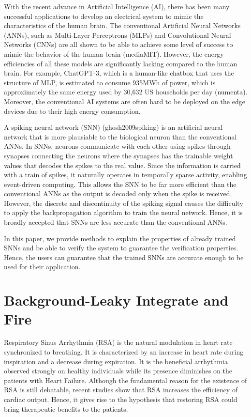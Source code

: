 \documentclass[conference]{IEEEtran}
\begin{document}
With the recent advance in Artificial Intelligence (AI), there has been many successful applications to develop an electrical system to mimic the 
characteristics of the human brain. The conventional Artificial Neural Networks (ANNs), such as Multi-Layer Perceptrons (MLPs) and Convolutional Neural Networks (CNNs) are all shown to be able to achieve
some level of success to mimic the behavior of the human brain (mediaMIT). However, the energy efficiencies of all these models are significantly lacking compared to the human brain. 
For example, ChatGPT-3, which is a human-like chatbox that uses the structure of MLP, is estimated to consume 935MWh 
of power, which is approximately the same energy used by 30,632 US households per day (numenta).
Moreover, the conventional AI systems are often hard to be deployed on the edge devices due to their high energy consumption.

A spiking neural network (SNN) (ghosh2009spiking) is an artificial neural network that is more plausiable to the biological neuron than the conventional ANNs. In SNNs, neurons
communicate with each other using spikes through synapses connecting the neurons where the synapses has the trainable weight values that decodes the spikes to the real value. Since the information is carried with a train of spikes, it naturally
operates in temporally sparse activity, enabling event-driven computing. This allows the SNN to be far more efficient than the conventional ANNs as the output is decoded only
when the spike is received. However, the discrete and discontinuity of the spiking signal causes the
difficulty to apply the backpropagation algorithm to train the neural network. Hence, it is broadly accepted that SNNs are less accurate than the conventional ANNs.

In this paper, we provide methods to explain the properties of already trained SNNs and be able to verify the
system to guarantee the verification properties. Hence, the users can guarantee that the trained SNNs are accurate enough to be used for their application.
\section{Background-Leaky Integrate and Fire}

Respiratory Sinus Arrhythmia (RSA) is the natural modulation in heart rate synchronized to breathing. It is characterized by an increase in heart rate during inspiration and a decrease during expiration.  It is the beneficial arrhythmia observed strongly on healthy individuals while its presence diminishes on the  patients with Heart Failure. Although the fundamental reason for the existence of RSA is still debatable, recent studies show that RSA increases the efficiency of cardiac output. Hence, it gives rise to the hypothesis that restoring RSA could bring therapeutic benefits to the patients. 
\end{document}
